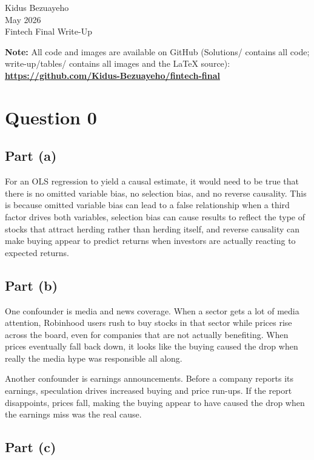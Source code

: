 \documentclass[12pt]{article}
\begin{document}
\noindent Kidus Bezuayeho \\
May 2026 \\
Fintech Final Write-Up

\noindent\textbf{Note:} All code and images are available on GitHub (Solutions/ contains all code; write-up/tables/ contains all images and the LaTeX source): \\
\textbf{\href{https://github.com/Kidus-Bezuayeho/fintech-final}{https://github.com/Kidus-Bezuayeho/fintech-final}}

\section*{Question 0}

\subsection*{Part (a)}

For an OLS regression to yield a causal estimate, it would need to be true that there is no omitted variable bias, no selection bias, and no reverse causality. This is because omitted variable bias can lead to a false relationship when a third factor drives both variables, selection bias can cause results to reflect the type of stocks that attract herding rather than herding itself, and reverse causality can make buying appear to predict returns when investors are actually reacting to expected returns.

\subsection*{Part (b)}

One confounder is media and news coverage. When a sector gets a lot of media attention, Robinhood users rush to buy stocks in that sector while prices rise across the board, even for companies that are not actually benefiting. When prices eventually fall back down, it looks like the buying caused the drop when really the media hype was responsible all along.

Another confounder is earnings announcements. Before a company reports its earnings, speculation drives increased buying and price run-ups. If the report disappoints, prices fall, making the buying appear to have caused the drop when the earnings miss was the real cause.

\subsection*{Part (c)}
\end{document}
